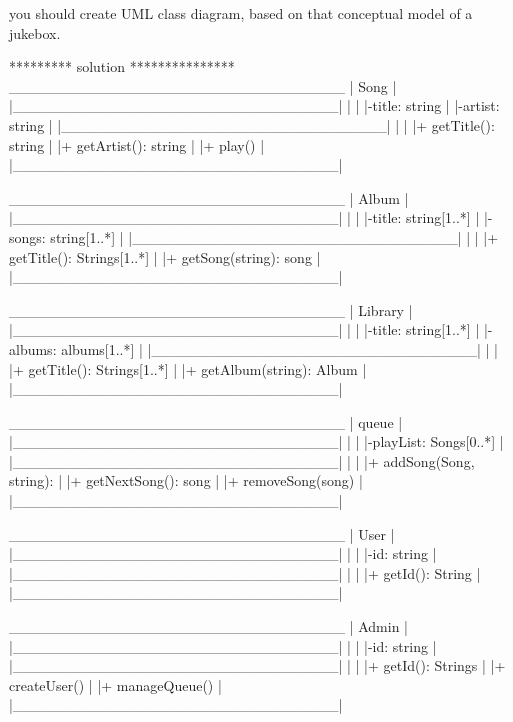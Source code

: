 you should create  UML class diagram, based on that conceptual model of a jukebox.

********* solution *************** 
________________________________
|             Song              |
|_______________________________|
|                               |
|-title: string                 |
|-artist: string                |
|_______________________________|
|                               |
|+ getTitle(): string           |
|+ getArtist(): string          |
|+ play()                       |
|_______________________________|


________________________________
|            Album              |
|_______________________________|
|                               |
|-title: string[1..*]           |
|-songs: string[1..*]           |
|_______________________________|
|                               |
|+ getTitle(): Strings[1..*]    |
|+ getSong(string): song        |
|_______________________________|


________________________________
|            Library            |
|_______________________________|
|                               |
|-title: string[1..*]           |
|-albums: albums[1..*]          |
|_______________________________|
|                               |
|+ getTitle(): Strings[1..*]    |
|+ getAlbum(string): Album      |
|_______________________________|


________________________________
|            queue              |
|_______________________________|
|                               |
|-playList: Songs[0..*]         |
|_______________________________|
|                               |
|+ addSong(Song, string):               |
|+ getNextSong(): song          |
|+ removeSong(song)             |
|_______________________________|


________________________________
|            User               |
|_______________________________|
|                               |
|-id: string                    |
|_______________________________|
|                               |
|+ getId(): String              |
|_______________________________|


________________________________
|            Admin              |
|_______________________________|
|                               |
|-id: string                    |
|_______________________________|
|                               |
|+ getId(): Strings             |
|+ createUser()                 |
|+ manageQueue()                |
|_______________________________|
